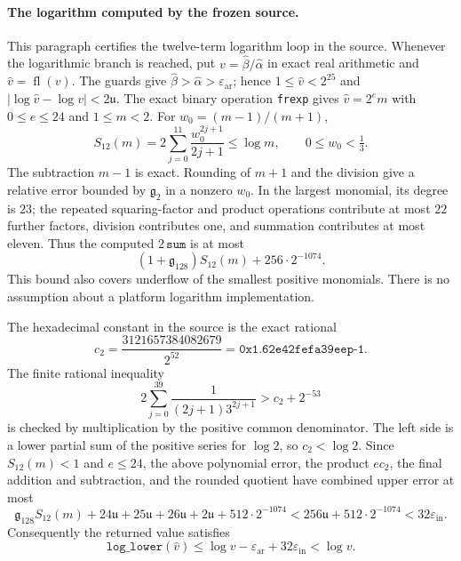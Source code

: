 \paragraph{The logarithm computed by the frozen source.}
This paragraph certifies the twelve-term logarithm loop in the source.
Whenever the
logarithmic branch is reached, put
$v=\widehat\beta/\widehat\alpha$ in exact real arithmetic and
$\widehat v=\operatorname{fl}(v)$.  The guards give
$\widehat\beta>\widehat\alpha>\varepsilon_{\mathrm{ar}}$; hence
$1\le\widehat v<2^{25}$ and $|\log\widehat v-\log v|<2\mathfrak u$.
The exact binary operation \texttt{frexp} gives $\widehat v=2^e m$ with
$0\le e\le24$ and $1\le m<2$.  For $w_0=(m-1)/(m+1)$,
\[
 S_{12}(m)=2\sum_{j=0}^{11}\frac{w_0^{2j+1}}{2j+1}
 \le\log m,\qquad 0\le w_0<\tfrac13.
\]
The subtraction $m-1$ is exact.  Rounding of $m+1$ and the division give
a relative error bounded by $\mathfrak g_2$
in a nonzero $w_0$.  In the largest monomial, its degree is $23$;
the repeated squaring-factor and product operations contribute at most
$22$ further factors, division contributes one, and summation contributes
at most eleven.  Thus the computed $2\,\texttt{sum}$ is at most
\[
 (1+\mathfrak g_{128})S_{12}(m)+256\cdot2^{-1074}.
\]
This bound also covers underflow of the smallest positive monomials.
There is no assumption about a platform logarithm implementation.

The hexadecimal constant in the source is the exact rational
\[
 c_2=\frac{3121657384082679}{2^{52}}
       =\texttt{0x1.62e42fefa39eep-1}.
\]
The finite rational inequality
\[
 2\sum_{j=0}^{39}\frac1{(2j+1)3^{2j+1}}
       > c_2+2^{-53}
\]
is checked by multiplication by the positive common denominator.
The left side is a lower partial sum of the positive series for $\log2$,
so $c_2<\log2$.  Since $S_{12}(m)<1$ and $e\le24$, the above
polynomial error, the product $ec_2$, the final addition and subtraction,
and the rounded quotient have combined upper error at most
\[
 \mathfrak g_{128}S_{12}(m)+24\mathfrak u+25\mathfrak u
 +26\mathfrak u+2\mathfrak u+512\cdot2^{-1074}
 <256\mathfrak u+512\cdot2^{-1074}
 <32\varepsilon_{\mathrm{in}}.
\]  Consequently the returned value satisfies
\begin{equation}
 \texttt{log\_lower}(\widehat v)
 \le\log v-\varepsilon_{\mathrm{ar}}
            +32\varepsilon_{\mathrm{in}}
 <\log v.
 \label{eq:cost-log-certified}
\end{equation}

